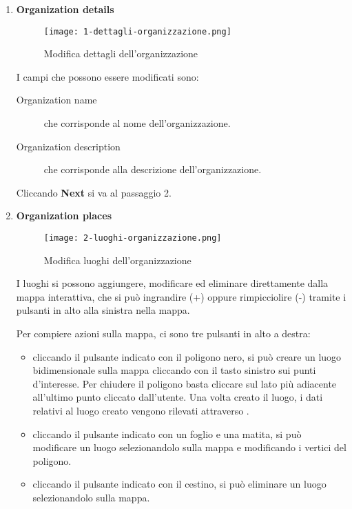 \documentclass[../manuale-utente.tex]{subfiles}
\begin{document}
\begin{enumerate}
    \item \textbf{Organization details}

    \begin{figure}[H]
        \centering
        \texttt{[image: 1-dettagli-organizzazione.png]}
        \caption{Modifica dettagli dell'organizzazione}%
        \label{fig:web_app_modifica_dettagli_organizzazione}
    \end{figure}

    I campi che possono essere modificati sono:
    \begin{description}
        \item[Organization name] che corrisponde al nome dell'organizzazione.
        \item[Organization description] che corrisponde alla descrizione dell'organizzazione.
    \end{description}

    Cliccando \textbf{Next} si va al passaggio 2.

    \newpage
    \item \textbf{Organization places}

    \begin{figure}[H]
        \centering
        \texttt{[image: 2-luoghi-organizzazione.png]}
        \caption{Modifica luoghi dell'organizzazione}%
        \label{fig:web_app_modifica_luoghi_organizzazione}
    \end{figure}

    I luoghi si possono aggiungere, modificare ed eliminare direttamente dalla mappa interattiva, che si può ingrandire (+) oppure rimpicciolire (-) tramite i pulsanti in alto alla sinistra nella mappa.

    Per compiere azioni sulla mappa, ci sono tre pulsanti in alto a destra:
    \begin{itemize}
        \item cliccando il pulsante indicato con il poligono nero, si può creare un luogo bidimensionale sulla mappa cliccando con il tasto sinistro sui punti d'interesse. Per chiudere il poligono basta cliccare sul lato più adiacente all'ultimo punto cliccato dall'utente. Una volta creato il luogo, i dati relativi al luogo creato vengono rilevati attraverso .
        \item cliccando il pulsante indicato con un foglio e una matita, si può modificare un luogo selezionandolo sulla mappa e modificando i vertici del poligono.
        \item cliccando il pulsante indicato con il cestino, si può eliminare un luogo selezionandolo sulla mappa.
    \end{itemize}


\end{enumerate}
\end{document}
